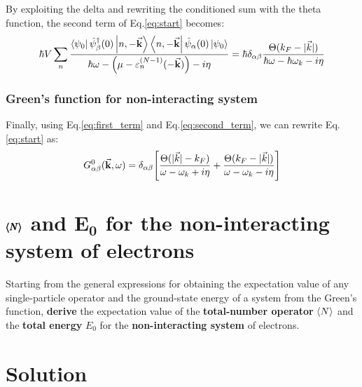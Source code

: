 \documentclass[11pt, a4paper, twoside, openright]{article}
\begin{document}
By exploiting the delta and rewriting the conditioned sum with the theta function, the second term of Eq.\eqref{eq:start} becomes:
\begin{equation}
  \hbar V \sum_{n}^{}
  \frac{
  \bra{\psi _0} \hat{\psi }_ \beta ^\dag (0) \ket{n, -\va{k}} \bra{n, -\va{k}}  \hat{\psi }_ \alpha
  (0)  \ket{\psi _0}
   }{  \hbar \omega - \qty( \mu - \varepsilon _n^{(N-1)} (-\va{k})) - i \eta }
    = \hbar \delta _{\alpha \beta } \frac{\Theta ( k_F - | \vec{k} |  )}{\hbar \omega - \hbar \omega _k - i \eta}
    \label{eq:second_term}
\end{equation}


\subsubsection*{Green's function for non-interacting system}
Finally, using Eq.\eqref{eq:first_term} and Eq.\eqref{eq:second_term}, we can rewrite Eq.\eqref{eq:start} as:
\begin{equation}
  G^0_{\alpha \beta } (\va{k}, \omega ) = \delta _{\alpha \beta } \qty[ \frac{\Theta (| \vec{k} | - k_F )}{\omega - \omega _k + i \eta }
  + \frac{\Theta ( k_F - | \vec{k} | )}{\omega - \omega _k - i \eta }]
  \label{eq:end}
\end{equation}


















\clearpage
\section{\( \pmb{\expval{N}}  \) and \( \pmb{E_0} \) for the non-interacting system of electrons}
Starting from the general expressions for obtaining the expectation value of any single-particle operator and the ground-state energy of a system from the Green’s function, \textbf{derive} the expectation value of the \textbf{total-number operator} \( \expval{N}  \) and the \textbf{total energy} \( E_0 \) for the \textbf{non-interacting system} of electrons.


\section*{Solution}
\end{document}
